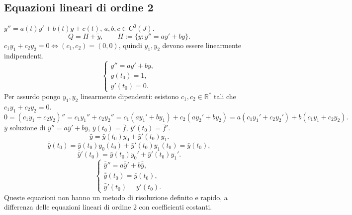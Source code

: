 \documentclass[11pt,a4paper]{article}
\newcommand{\R}{\mathbb R}\newcommand{\N}{\mathbb N}\newcommand{\pagina}[1]{\clearpage}
\begin{document}
\subsection*{Equazioni lineari di ordine 2}
$y''=a(t)y'+b(t)y+c(t)$, $a,b,c\in C^0(J)$.
\[Q=H+\widetilde y,\qquad H:=\{y:y''=ay'+by\}.\]
$c_1y_1+c_2y_2=0\iff(c_1,c_2)=(0,0)$, quindi $y_1,y_2$ devono essere linearmente indipendenti.
\[\begin{cases}y''=ay'+by,\\y(t_0)=1,\\y'(t_0)=0.\end{cases}\]
Per assurdo pongo $y_1,y_2$ linearmente dipendenti: esistono $c_1,c_2\in\R^*$ tali che $c_1y_1+c_2y_2=0$.
\[0=(c_1y_1+c_2y_2)''=c_1y_1''+c_2y_2''=c_1(ay_1'+by_1)+c_2(ay_2'+by_2)
=a(c_1y_1'+c_2y_2')+b(c_1y_1+c_2y_2).\]
$\bar y$ soluzione di $\bar y''=a\bar y'+b\bar y$, $\bar y(t_0)=\bar f$, $\bar y'(t_0)=\bar f'$.
\[\bar{\bar y}=\bar y(t_0)y_0+\bar y'(t_0)y_1.\]
\[\bar{\bar y}(t_0)=\bar y(t_0)y_0(t_0)+\bar y'(t_0)y_1(t_0)=\bar y(t_0),\]
\[\bar{\bar y}'(t_0)=\bar y(t_0)y_0'+\bar y'(t_0)y_1'.\]
\[\begin{cases}\bar{\bar y}''=a\bar{\bar y}'+b\bar{\bar y},\\\bar{\bar y}(t_0)=\bar y(t_0),\\\bar{\bar y}'(t_0)=\bar y'(t_0).\end{cases}\]
Queste equazioni non hanno un metodo di risoluzione definito e rapido, a differenza delle equazioni lineari di ordine 2 con coefficienti costanti.
\pagina{51}
\end{document}
